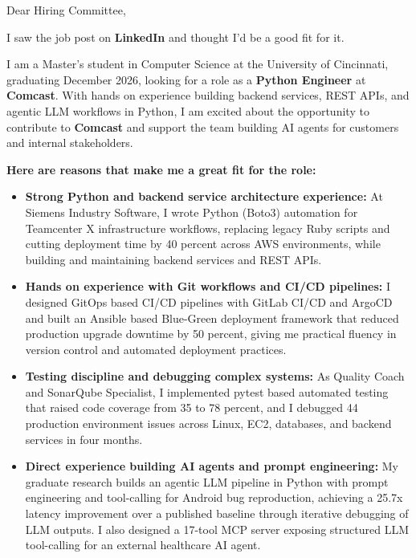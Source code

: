 \documentclass[11pt]{letter}
\date{}
\begin{document}
\begin{letter}{}

\opening{Dear Hiring Committee,}

I saw the job post on \textbf{LinkedIn} and thought I'd be a good fit for it.

I am a Master's student in Computer Science at the University of Cincinnati, graduating December 2026, looking for a role as a \textbf{Python Engineer} at \textbf{Comcast}. With hands on experience building backend services, REST APIs, and agentic LLM workflows in Python, I am excited about the opportunity to contribute to \textbf{Comcast} and support the team building AI agents for customers and internal stakeholders.

\textbf{Here are reasons that make me a great fit for the role:}

\begin{itemize}[leftmargin=*, itemsep=0.45em]
    \item \textbf{Strong Python and backend service architecture experience:} At Siemens Industry Software, I wrote Python (Boto3) automation for Teamcenter X infrastructure workflows, replacing legacy Ruby scripts and cutting deployment time by 40 percent across AWS environments, while building and maintaining backend services and REST APIs.

    \item \textbf{Hands on experience with Git workflows and CI/CD pipelines:} I designed GitOps based CI/CD pipelines with GitLab CI/CD and ArgoCD and built an Ansible based Blue-Green deployment framework that reduced production upgrade downtime by 50 percent, giving me practical fluency in version control and automated deployment practices.

    \item \textbf{Testing discipline and debugging complex systems:} As Quality Coach and SonarQube Specialist, I implemented pytest based automated testing that raised code coverage from 35 to 78 percent, and I debugged 44 production environment issues across Linux, EC2, databases, and backend services in four months.

    \item \textbf{Direct experience building AI agents and prompt engineering:} My graduate research builds an agentic LLM pipeline in Python with prompt engineering and tool-calling for Android bug reproduction, achieving a 25.7x latency improvement over a published baseline through iterative debugging of LLM outputs. I also designed a 17-tool MCP server exposing structured LLM tool-calling for an external healthcare AI agent.


\end{itemize}
\end{letter}
\end{document}
